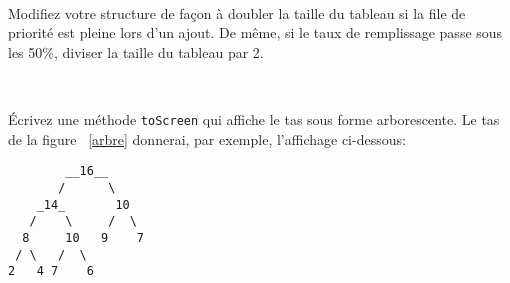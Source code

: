 \documentclass[iutinfo,a4paper,11pt]{ustl-tdtp}
\begin{document}
~\\

Modifiez votre structure de façon à doubler la taille du tableau si la
file de priorité est pleine lors d'un ajout. De même, si le taux de
remplissage passe sous les 50\%, diviser la taille du tableau par 2.

~\\

Écrivez une méthode \texttt{toScreen} qui affiche le tas sous forme
arborescente. Le tas de la figure ~\ref{arbre} donnerai,
par exemple, l'affichage ci-dessous:

\begin{verbatim}
        __16__
       /      \
    _14_       10
   /    \     /  \
  8     10   9    7
 / \   /  \
2   4 7    6
\end{verbatim}



\end{document}
